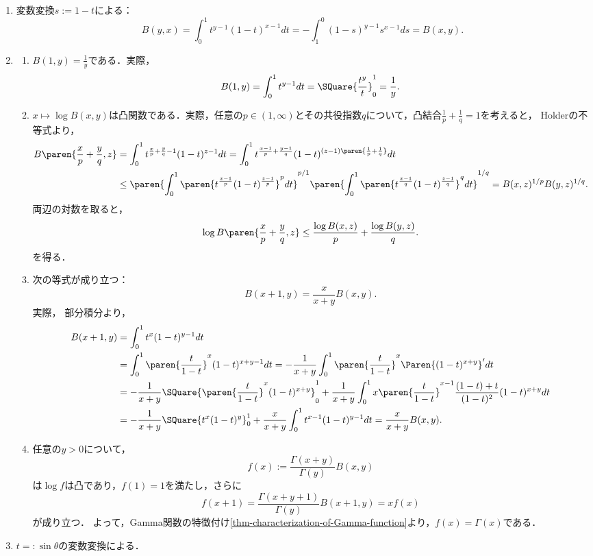 \documentclass[uplatex,dvipdfmx]{jsreport}
\begin{document}
\begin{Proof}\mbox{}
    \begin{enumerate}
        \item 変数変換$s:=1-t$による：
        \[B(y,x)=\int^1_0t^{y-1}(1-t)^{x-1}dt=-\int^0_1(1-s)^{y-1}s^{x-1}ds=B(x,y).\]
        \item \begin{enumerate}[{Step}1]
            \item $B(1,y)=\frac{1}{y}$である．実際，
            \[B(1,y)=\int^1_0t^{y-1}dt=\SQuare{\frac{t^y}{t}}^1_0=\frac{1}{y}.\]
            \item $x\mapsto\log B(x,y)$は凸関数である．実際，任意の$p\in(1,\infty)$とその共役指数$q$について，凸結合$\frac{1}{p}+\frac{1}{q}=1$を考えると，
            Holderの不等式より，
            \begin{align*}
                B\paren{\frac{x}{p}+\frac{y}{q},z}&=\int^1_0t^{\frac{x}{p}+\frac{y}{q}-1}(1-t)^{z-1}dt=\int^1_0t^{\frac{x-1}{p}+\frac{y-1}{q}}(1-t)^{(z-1)\paren{\frac{1}{p}+\frac{1}{q}}}dt\\
                &\le\paren{\int^1_0\paren{t^{\frac{x-1}{p}}(1-t)^{\frac{z-1}{p}}}^pdt}^{p/1}\paren{\int^1_0\paren{t^{\frac{x-1}{q}}(1-t)^{\frac{z-1}{q}}}^qdt}^{1/q}=B(x,z)^{1/p}B(y,z)^{1/q}.
            \end{align*}
            両辺の対数を取ると，
            \[\log B\paren{\frac{x}{p}+\frac{y}{q},z}\le\frac{\log B(x,z)}{p}+\frac{\log B(y,z)}{q}.\]
            を得る．
            \item 次の等式が成り立つ：
            \[B(x+1,y)=\frac{x}{x+y}B(x,y).\]
            実際，
            部分積分より，
            \begin{align*}
                B(x+1,y)&=\int^1_0t^x(1-t)^{y-1}dt\\
                &=\int^1_0\paren{\frac{t}{1-t}}^x(1-t)^{x+y-1}dt=-\frac{1}{x+y}\int^1_0\paren{\frac{t}{1-t}}^x\Paren{(1-t)^{x+y}}'dt\\
                &=-\frac{1}{x+y}\SQuare{\paren{\frac{t}{1-t}}^x(1-t)^{x+y}}^1_0+\frac{1}{x+y}\int^1_0x\paren{\frac{t}{1-t}}^{x-1}\frac{(1-t)+t}{(1-t)^2}(1-t)^{x+y}dt\\
                &=-\frac{1}{x+y}\SQuare{t^x(1-t)^y}^1_0+\frac{x}{x+y}\int^1_0t^{x-1}(1-t)^{y-1}dt=\frac{x}{x+y}B(x,y).
            \end{align*}
            \item 任意の$y>0$について，
            \[f(x):=\frac{\Gamma(x+y)}{\Gamma(y)}B(x,y)\]
            は$\log f$は凸であり，$f(1)=1$を満たし，さらに\[f(x+1)=\frac{\Gamma(x+y+1)}{\Gamma(y)}B(x+1,y)=xf(x)\]が成り立つ．
            よって，Gamma関数の特徴付け\ref{thm-characterization-of-Gamma-function}より，$f(x)=\Gamma(x)$である．
        \end{enumerate}
        \item $t=:\sin\theta$の変数変換による．
    \end{enumerate}
\end{Proof}
\end{document}

